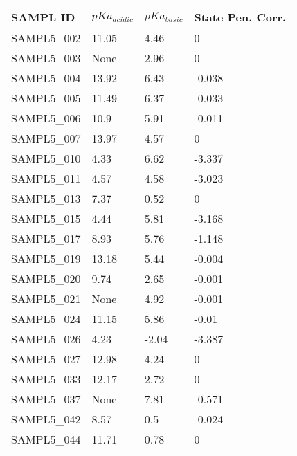 \documentclass{article}
\begin{document}
\begin{table}[]
\centering
\begin{tabular}{|l|l|l|l|}
\hline
SAMPL ID    & $pKa_{acidic}$ & $pKa_{basic}$ & State Pen. Corr. \\ \hline
SAMPL5\_002 & 11.05          & 4.46          & 0                \\ \hline
SAMPL5\_003 & None           & 2.96          & 0                \\ \hline
SAMPL5\_004 & 13.92          & 6.43          & -0.038           \\ \hline
SAMPL5\_005 & 11.49          & 6.37          & -0.033           \\ \hline
SAMPL5\_006 & 10.9           & 5.91          & -0.011           \\ \hline
SAMPL5\_007 & 13.97          & 4.57          & 0                \\ \hline
SAMPL5\_010 & 4.33           & 6.62          & -3.337           \\ \hline
SAMPL5\_011 & 4.57           & 4.58          & -3.023           \\ \hline
SAMPL5\_013 & 7.37           & 0.52          & 0                \\ \hline
SAMPL5\_015 & 4.44           & 5.81          & -3.168           \\ \hline
SAMPL5\_017 & 8.93           & 5.76          & -1.148           \\ \hline
SAMPL5\_019 & 13.18          & 5.44          & -0.004           \\ \hline
SAMPL5\_020 & 9.74           & 2.65          & -0.001           \\ \hline
SAMPL5\_021 & None           & 4.92          & -0.001           \\ \hline
SAMPL5\_024 & 11.15          & 5.86          & -0.01            \\ \hline
SAMPL5\_026 & 4.23           & -2.04         & -3.387           \\ \hline
SAMPL5\_027 & 12.98          & 4.24          & 0                \\ \hline
SAMPL5\_033 & 12.17          & 2.72          & 0                \\ \hline
SAMPL5\_037 & None           & 7.81          & -0.571           \\ \hline
SAMPL5\_042 & 8.57           & 0.5           & -0.024           \\ \hline
SAMPL5\_044 & 11.71          & 0.78          & 0                \\ \hline

\end{tabular}
\end{table}
\end{document}
